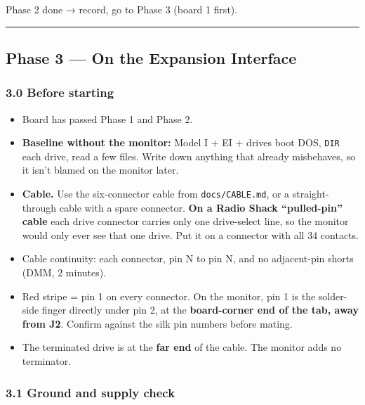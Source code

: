 \documentclass[
  10pt,
]{article}
\providecommand{\tightlist}{%
  \setlength{\itemsep}{0pt}\setlength{\parskip}{0pt}}
\begin{document}
Phase 2 done → record, go to Phase 3 (board 1 first).

\begin{center}\rule{0.5\linewidth}{0.5pt}\end{center}

\hypertarget{phase-3-on-the-expansion-interface}{%
\subsection{Phase 3 --- On the Expansion
Interface}\label{phase-3-on-the-expansion-interface}}

\hypertarget{before-starting}{%
\subsubsection{3.0 Before starting}\label{before-starting}}

\begin{itemize}
\tightlist
\item[$\square$]
  Board has passed Phase 1 and Phase 2.
\item[$\square$]
  \textbf{Baseline without the monitor:} Model I + EI +
  drives boot DOS, \texttt{DIR} each drive, read a few
  files. Write down anything that already misbehaves, so it
  isn't blamed on the monitor later.
\item[$\square$]
  \textbf{Cable.} Use the six-connector cable from
  \texttt{docs/CABLE.md}, or a straight-through cable with a
  spare connector. \textbf{On a Radio Shack ``pulled-pin''
  cable} each drive connector carries only one drive-select
  line, so the monitor would only ever see that one drive.
  Put it on a connector with all 34 contacts.
\item[$\square$]
  Cable continuity: each connector, pin N to pin N, and no
  adjacent-pin shorts (DMM, 2 minutes).
\item[$\square$]
  Red stripe = pin 1 on every connector. On the monitor, pin
  1 is the solder-side finger directly under pin 2, at the
  \textbf{board-corner end of the tab, away from J2}.
  Confirm against the silk pin numbers before mating.
\item[$\square$]
  The terminated drive is at the \textbf{far end} of the
  cable. The monitor adds no terminator.
\end{itemize}

\hypertarget{ground-and-supply-check}{%
\subsubsection{3.1 Ground and supply
check}\label{ground-and-supply-check}}
\end{document}
